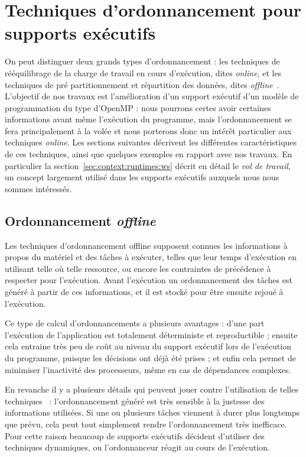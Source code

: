 \section{Techniques d'ordonnancement pour supports exécutifs}\label{sec:context:runtimes}

On peut distinguer deux grands types d'ordonnancement : les techniques de rééquilibrage de la charge de travail en cours d'exécution, dites \emph{online}, et les techniques de pré partitionnement et répartition des données, dites \emph{offline}~\cite{Karp1992}.
L'objectif de nos travaux est l'amélioration d'un support exécutif d'un modèle de programmation du type d'OpenMP : nous pourrons certes avoir certaines informations avant même l'exécution du programme, mais l'ordonnancement se fera principalement à la volée et nous porterons donc un intérêt particulier aux techniques \emph{online}.
Les sections suivantes décrivent les différentes caractéristiques de ces techniques, ainsi que quelques exemples en rapport avec nos travaux.
En particulier la section~\ref{sec:context:runtimes:ws} décrit en détail le \emph{vol de travail}, un concept largement utilisé dans les supports exécutifs auxquels nous nous sommes intéressés.

\subsection{Ordonnancement \emph{offline}}

Les techniques d'ordonnancement offline supposent connues les informations à propos du matériel et des tâches à exécuter, telles que leur temps d'exécution en utilisant telle où telle ressource, ou encore les contraintes de précédence à respecter pour l'exécution.
Avant l'exécution un ordonnancement des tâches est généré à partir de ces informations, et il est stocké pour être ensuite rejoué à l'exécution.

Ce type de calcul d'ordonnancements a plusieurs avantages : d'une part l'exécution de l'application est totalement déterministe et reproductible ; ensuite cela entraine très peu de coût au niveau du support exécutif lors de l'exécution du programme, puisque les décisions ont déjà été prises ; et enfin cela permet de minimiser l'inactivité des processeurs, même en cas de dépendances complexes.

En revanche il y a plusieurs détails qui peuvent jouer contre l'utilisation de telles techniques~\cite{Locke1992} : l'ordonnancement généré est très sensible à la justesse des informations utilisées. Si une ou plusieurs tâches viennent à durer plus longtemps que prévu, cela peut tout simplement rendre l'ordonnancement très inefficace.
Pour cette raison beaucoup de supports exécutifs décident d'utiliser des techniques dynamiques, ou l'ordonnanceur réagit au cours de l'exécution.


